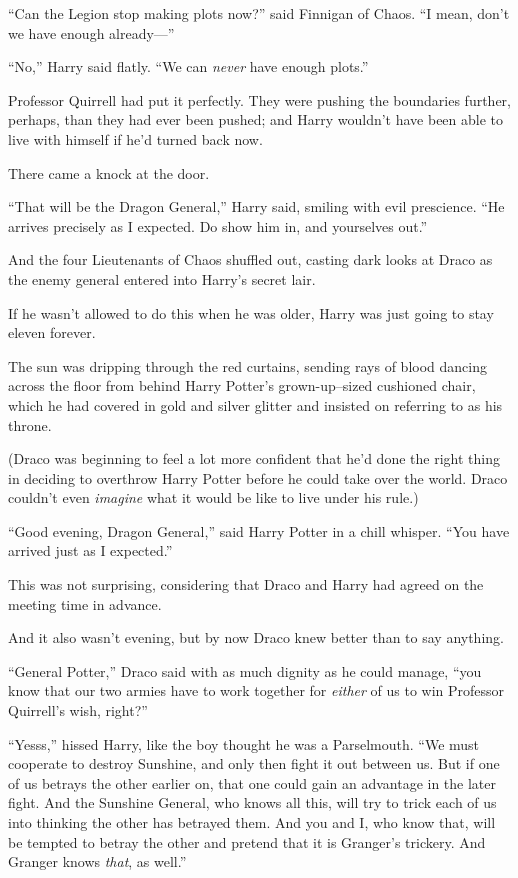 “Can the Legion stop making plots now?” said Finnigan of Chaos. “I mean, don’t we have enough already—”

“No,” Harry said flatly. “We can \emph{never} have enough plots.”

Professor Quirrell had put it perfectly. They were pushing the boundaries further, perhaps, than they had ever been pushed; and Harry wouldn’t have been able to live with himself if he’d turned back now.

There came a knock at the door.

“That will be the Dragon General,” Harry said, smiling with evil prescience. “He arrives precisely as I expected. Do show him in, and yourselves out.”

And the four Lieutenants of Chaos shuffled out, casting dark looks at Draco as the enemy general entered into Harry’s secret lair.

If he wasn’t allowed to do this when he was older, Harry was just going to stay eleven forever.

\later

The sun was dripping through the red curtains, sending rays of blood dancing across the floor from behind Harry Potter’s grown-up–sized cushioned chair, which he had covered in gold and silver glitter and insisted on referring to as his throne.

(Draco was beginning to feel a lot more confident that he’d done the right thing in deciding to overthrow Harry Potter before he could take over the world. Draco couldn’t even \emph{imagine} what it would be like to live under his rule.)

“Good evening, Dragon General,” said Harry Potter in a chill whisper. “You have arrived just as I expected.”

This was not surprising, considering that Draco and Harry had agreed on the meeting time in advance.

And it also wasn’t evening, but by now Draco knew better than to say anything.

“General Potter,” Draco said with as much dignity as he could manage, “you know that our two armies have to work together for \emph{either} of us to win Professor Quirrell’s wish, right?”

“Yesss,” hissed Harry, like the boy thought he was a Parselmouth. “We must cooperate to destroy Sunshine, and only then fight it out between us. But if one of us betrays the other earlier on, that one could gain an advantage in the later fight. And the Sunshine General, who knows all this, will try to trick each of us into thinking the other has betrayed them. And you and I, who know that, will be tempted to betray the other and pretend that it is Granger’s trickery. And Granger knows \emph{that}, as well.”

